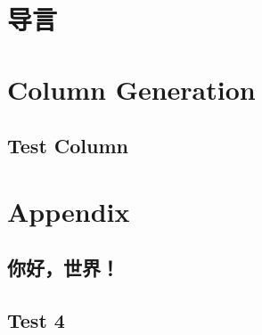 \documentclass[10pt, a4paper, fontset=none, no-math]{ctexbook}
\begin{document}
\lipsum[30-50]


\chapter{导言}

\lipsum[10-20]

\chapter{Column Generation}

\lipsum[5-10]

\section{Test Column}

\lipsum[10-20]

\backmatter

\chapter*{Appendix}

\lipsum[40-50]

\section*{你好，世界！}

\lipsum[5-10]

\section{Test 4}

\lipsum[10-20]


% 
\end{document}
